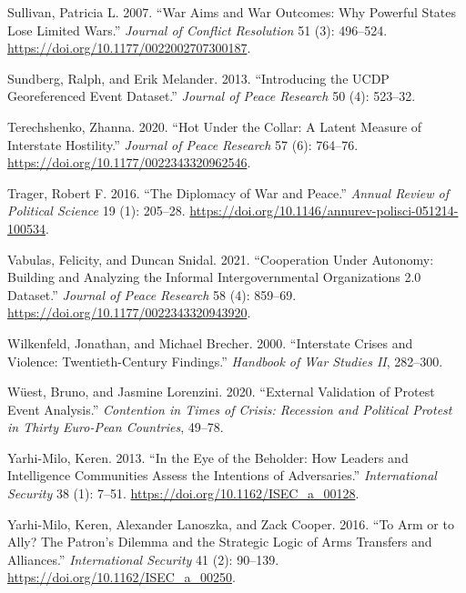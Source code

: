 \documentclass{article}
\newlength{\cslhangindent}
\newlength{\cslentryspacingunit} %
\newenvironment{CSLReferences}[2] %
 {%
  \setlength{\parindent}{0pt}
  \ifodd #1
  \let\oldpar\par
  \def\par{\hangindent=\cslhangindent\oldpar}
  \fi
  \setlength{\parskip}{#2\cslentryspacingunit}
 }%
 {}
\begin{document}
\begin{CSLReferences}{1}{0}
\leavevmode{}%
Sullivan, Patricia L. 2007. {``War {Aims} and {War Outcomes}: {Why
Powerful States Lose Limited Wars}.''} \emph{Journal of Conflict
Resolution} 51 (3): 496--524.
\url{https://doi.org/10.1177/0022002707300187}.

\leavevmode{}%
Sundberg, Ralph, and Erik Melander. 2013. {``Introducing the {UCDP}
Georeferenced Event Dataset.''} \emph{Journal of Peace Research} 50 (4):
523--32.

\leavevmode{}%
Terechshenko, Zhanna. 2020. {``Hot Under the Collar: {A} Latent Measure
of Interstate Hostility.''} \emph{Journal of Peace Research} 57 (6):
764--76. \url{https://doi.org/10.1177/0022343320962546}.

\leavevmode{}%
Trager, Robert F. 2016. {``The {Diplomacy} of {War} and {Peace}.''}
\emph{Annual Review of Political Science} 19 (1): 205--28.
\url{https://doi.org/10.1146/annurev-polisci-051214-100534}.

\leavevmode{}%
Vabulas, Felicity, and Duncan Snidal. 2021. {``Cooperation Under
Autonomy: {Building} and Analyzing the {Informal Intergovernmental
Organizations} 2.0 Dataset.''} \emph{Journal of Peace Research} 58 (4):
859--69. \url{https://doi.org/10.1177/0022343320943920}.

\leavevmode{}%
Wilkenfeld, Jonathan, and Michael Brecher. 2000. {``Interstate Crises
and Violence: Twentieth-Century Findings.''} \emph{Handbook of War
Studies II}, 282--300.

\leavevmode{}%
Wüest, Bruno, and Jasmine Lorenzini. 2020. {``External Validation of
Protest Event Analysis.''} \emph{Contention in Times of Crisis:
Recession and Political Protest in Thirty Euro-Pean Countries}, 49--78.

\leavevmode{}%
Yarhi-Milo, Keren. 2013. {``In the {Eye} of the {Beholder}: {How
Leaders} and {Intelligence Communities Assess} the {Intentions} of
{Adversaries}.''} \emph{International Security} 38 (1): 7--51.
\url{https://doi.org/10.1162/ISEC_a_00128}.

\leavevmode{}%
Yarhi-Milo, Keren, Alexander Lanoszka, and Zack Cooper. 2016. {``To
{Arm} or to {Ally}? {The Patron}'s {Dilemma} and the {Strategic Logic}
of {Arms Transfers} and {Alliances}.''} \emph{International Security} 41
(2): 90--139. \url{https://doi.org/10.1162/ISEC_a_00250}.


\end{CSLReferences}
\end{document}
